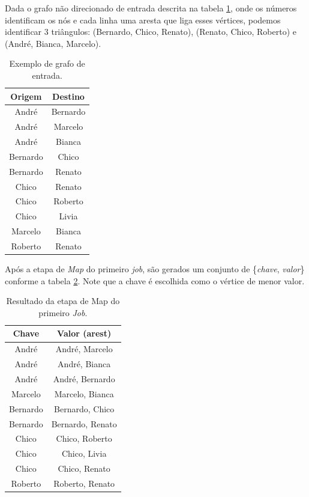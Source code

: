 Dada o grafo não direcionado de entrada descrita na tabela \ref{grafoExemplo}, onde os números identificam 
os nós e cada linha uma aresta que liga esses vértices, podemos identificar 3 triângulos: 
(Bernardo, Chico, Renato), (Renato, Chico, Roberto) e (André, Bianca, Marcelo).

\begin{table}[!htbp]
\centering
\caption{Exemplo de grafo de entrada.}
\label{grafoExemplo}
\begin{tabular}{|c|c|}
\hline
{\bf Origem} & {\bf Destino} \\ \hline
André        & Bernardo      \\ \hline
André        & Marcelo       \\ \hline
André        & Bianca        \\ \hline
Bernardo     & Chico         \\ \hline
Bernardo     & Renato        \\ \hline
Chico        & Renato        \\ \hline
Chico        & Roberto       \\ \hline
Chico        & Livia         \\ \hline
Marcelo      & Bianca        \\ \hline
Roberto      & Renato        \\ \hline      
\end{tabular}
\end{table}

Após a etapa de \textit{Map} do primeiro \textit{job}, são gerados um conjunto de 
\{\textit{chave}, \textit{valor}\} conforme a tabela \ref{map1}. Note que a chave é escolhida como 
o vértice de menor valor.

\begin{table}[!htbp]
\centering
\caption{Resultado da etapa de Map do primeiro \textit{Job}.}
\label{map1}
\begin{tabular}{|c|c|}

\hline
{\bf Chave} & {\bf Valor (arest)}      \\ \hline
André       & André, Marcelo   \\ \hline
André       & André, Bianca    \\ \hline
André       & André, Bernardo  \\ \hline
Marcelo     & Marcelo, Bianca  \\ \hline
Bernardo    & Bernardo, Chico  \\ \hline
Bernardo    & Bernardo, Renato \\ \hline
Chico       & Chico, Roberto   \\ \hline
Chico       & Chico, Livia     \\ \hline
Chico       & Chico, Renato    \\ \hline
Roberto     & Roberto, Renato  \\ \hline     
\end{tabular}
\end{table}

